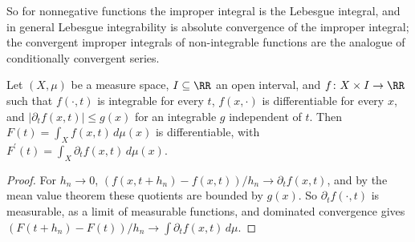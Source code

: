 So for nonnegative functions the improper integral is the Lebesgue integral, and in general Lebesgue integrability is absolute convergence of the improper integral; the convergent improper integrals
of non-integrable functions are the analogue of conditionally convergent series.

\begin{proposition}\label{measure-theory:proposition-differentiation-integral}
Let $(X, \mu)$ be a measure space, $I \subseteq \RR$ an open interval, and $f \colon X \times I \to \RR$ such that $f(\cdot, t)$ is integrable for every $t$, $f(x, \cdot)$ is differentiable for every $x$,
and $|\partial_tf(x, t)| \leq g(x)$ for an integrable $g$ independent of $t$. Then $F(t) = \int_Xf(x, t)\,d\mu(x)$ is differentiable, with $F^{\prime}(t) = \int_X\partial_tf(x, t)\,d\mu(x)$.
\end{proposition}

\begin{proof}
For $h_n \to 0$, $(f(x, t + h_n) - f(x, t))/h_n \to \partial_tf(x, t)$, and by the mean value theorem these quotients are bounded by $g(x)$. So $\partial_tf(\cdot, t)$ is measurable, as a limit of
measurable functions, and dominated convergence gives $(F(t + h_n) - F(t))/h_n \to \int\partial_tf(x, t)\,d\mu$.
\end{proof}

